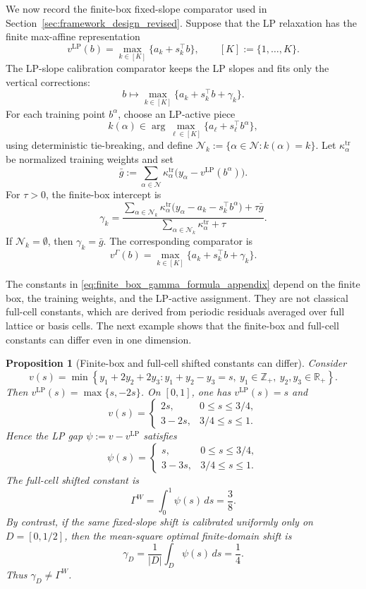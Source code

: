 \documentclass[11pt,letterpaper]{article}
\newtheorem{proposition}[theorem]{Proposition}
\theoremstyle{definition}
\theoremstyle{remark}
\newcommand{\LP}{\mathrm{LP}}
\begin{document}
We now record the finite-box fixed-slope comparator used in
Section~\ref{sec:framework_design_revised}. Suppose that the LP relaxation has
the finite max-affine representation
$$
v^{\LP}(b)
=
\max_{k\in[K]}\{a_k+s_k^\top b\},
\qquad
[K]:=\{1,\ldots,K\}.
$$
The LP-slope calibration comparator keeps the LP slopes and fits only the vertical
corrections:
$$
b\mapsto
\max_{k\in[K]}\{a_k+s_k^\top b+\gamma_k\}.
$$
For each training point $b^\alpha$, choose an LP-active piece
$$
k(\alpha)
\in
\arg\max_{\ell\in[K]}
\{a_\ell+s_\ell^\top b^\alpha\},
$$
using deterministic tie-breaking, and define
$
\mathcal N_k:=\{\alpha\in\mathcal N:k(\alpha)=k\}.
$
Let $\kappa_\alpha^{\mathrm{tr}}$ be normalized training weights and set
$$
\bar g
:=
\sum_{\alpha\in\mathcal N}
\kappa_\alpha^{\mathrm{tr}}
\bigl(y_\alpha-v^{\LP}(b^\alpha)\bigr).
$$
For $\tau>0$, the finite-box intercept is
\begin{equation}
\label{eq:finite_box_gamma_formula_appendix}
\gamma_k
=
\frac{
\sum_{\alpha\in \mathcal N_k}
\kappa_\alpha^{\mathrm{tr}}
\bigl(y_\alpha-a_k-s_k^\top b^\alpha\bigr)
+
\tau\bar g
}{
\sum_{\alpha\in \mathcal N_k}\kappa_\alpha^{\mathrm{tr}}+\tau
}.
\end{equation}
If $\mathcal N_k=\emptyset$, then $\gamma_k=\bar g$. The corresponding
comparator is
$$
v^\Gamma(b)
=
\max_{k\in[K]}
\{a_k+s_k^\top b+\gamma_k\}.
$$

The constants in \eqref{eq:finite_box_gamma_formula_appendix} depend on the
finite box, the training weights, and the LP-active assignment. They are not
classical full-cell constants, which are derived from periodic residuals
averaged over full lattice or basis cells. The next example shows that the
finite-box and full-cell constants can differ even in one dimension.

\begin{proposition}[Finite-box and full-cell shifted constants can differ]
\label{prop:finite_box_vs_full_cell_shift}
Consider
$$
v(s)
=
\min
\left\{
y_1+2y_2+2y_3:
y_1+y_2-y_3=s,\ 
y_1\in\mathbb Z_+,\ 
y_2,y_3\in\mathbb R_+
\right\}.
$$
Then $v^{\LP}(s)=\max\{s,-2s\}$. On $[0,1]$, one has
$v^{\LP}(s)=s$ and
$$
v(s)
=
\begin{cases}
2s, & 0\le s\le 3/4,\\[1mm]
3-2s, & 3/4\le s\le 1.
\end{cases}
$$
Hence the LP gap $\psi:=v-v^{\LP}$ satisfies
$$
\psi(s)
=
\begin{cases}
s, & 0\le s\le 3/4,\\[1mm]
3-3s, & 3/4\le s\le 1.
\end{cases}
$$
The full-cell shifted constant is
$$
\Gamma^W
=
\int_0^1\psi(s)\,ds
=
\frac38.
$$
By contrast, if the same fixed-slope shift is calibrated uniformly only on
$D=[0,1/2]$, then the mean-square optimal finite-domain shift is
$$
\gamma_D
=
\frac1{|D|}\int_D\psi(s)\,ds
=
\frac14.
$$
Thus $\gamma_D\neq\Gamma^W$.
\end{proposition}
\end{document}
